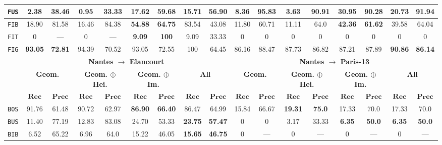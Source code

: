 \begin{sidewaystable}[htbp]
\begin{tabular}{|c | c c | c c | c c | c c || c c | c c | c c | c c |}
                \hline
                \texttt{FUS} & 2.38 & 38.46 & 0.95 & 33.33 & \textbf{17.62} & \textbf{59.68} & 15.71 & 56.90 & 8.36 & 95.83 & 3.63 & 90.91 & \textbf{30.95} & \textbf{90.28} & 20.73 & 91.94 \\
                \hline
                \texttt{FIB} & 18.90 & 81.58 & 16.46 & 84.38 & \textbf{54.88} & \textbf{64.75} & 83.54 & 43.08 & 11.80 & 60.71 & 11.11 & 64.0 & \textbf{42.36} & \textbf{61.62} & 39.58 & 64.04 \\ 
                \hline
                \texttt{FIT} & 0 & --- & 0 & --- & \textbf{9.09} & \textbf{100} & 9.09 & 33.33 & 0 & 0 & 0 & 0 & 0 & 0 & 0 & 0 \\
                \hline
                \texttt{FIG} & \textbf{93.05} & \textbf{72.81} & 94.39 & 70.52 & 93.05 & 72.55 & 100 & 64.45 & 86.16 & 88.47 & 87.73 & 86.82 & 87.21 & 87.89 & \textbf{90.86} & \textbf{86.14} \\
                \hline
                \hline
                & \multicolumn{8}{c||}{\textbf{Nantes \(\rightarrow\) Elancourt}} & \multicolumn{8}{c|}{\textbf{Nantes \(\rightarrow\) Paris-13}}\\
                \hline
                &\multicolumn{2}{c|}{\textbf{Geom.}} & \multicolumn{2}{c|}{\textbf{Geom. \(\oplus\) Hei.}} & \multicolumn{2}{c|}{\textbf{Geom. \(\oplus\) Im.}} & \multicolumn{2}{c||}{\textbf{All}} & \multicolumn{2}{c|}{\textbf{Geom.}} & \multicolumn{2}{c|}{\textbf{Geom. \(\oplus\) Hei.}} & \multicolumn{2}{c|}{\textbf{Geom. \(\oplus\) Im.}} & \multicolumn{2}{x{1.5cm}|}{\textbf{All}}\\
                \cline{2-17}
                & \(\bm{Rec}\) & \(\bm{Prec}\) &  \(\bm{Rec}\) & \(\bm{Prec}\) &  \(\bm{Rec}\) & \(\bm{Prec}\) &  \(\bm{Rec}\) & \(\bm{Prec}\) & \(\bm{Rec}\) & \(\bm{Prec}\) &  \(\bm{Rec}\) & \(\bm{Prec}\) &  \(\bm{Rec}\) & \(\bm{Prec}\) &  \(\bm{Rec}\) & \(\bm{Prec}\) \\
                \hline
                \texttt{BOS} & 91.76 & 61.48 & 90.72 & 62.97 & \textbf{86.90} & \textbf{66.40} & 86.47 & 64.99 & 15.84 & 66.67 & \textbf{19.31} & \textbf{75.0} & 17.33 & 70.0 & 17.33 & 70.0 \\
                \hline
                \texttt{BUS} & 11.40 & 77.19 & 12.83 & 83.08 & 24.70 & 53.33 & \textbf{23.75} & \textbf{57.47} & 0 & 0 & 3.17 & 33.33 & \textbf{6.35} & \textbf{50.0} & \textbf{6.35} & \textbf{50.0} \\
                \hline
                \texttt{BIB} & 6.52 & 65.22 & 6.96 & 64.0 & 15.22 & 46.05 & \textbf{15.65} & \textbf{46.75} & 0 & --- & 0 & --- & 0 & --- & 0 & --- \\

\end{tabular}
\end{sidewaystable}
